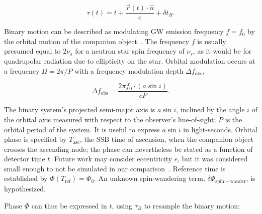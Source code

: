 
\begin{equation}
\tau(t) 
 = t + \frac{\vec{r}(t) \cdot \hat{n}}{c} + \delta t_R.
\label{barycentering_time_domain}
\end{equation}

Binary motion can be described as modulating GW emission frequency $f=f_0$ by the orbital motion of the companion object~\cite{GoetzTwoSpectResults2014}.
The frequency $f$ is usually presumed equal to $2\nu_s$ for a neutron star spin frequency of $\nu_s$, as it would be for quadrupolar radiation due to ellipticity on the star.
Orbital modulation occurs at a frequency $\Omega = 2\pi/P$ with a frequency modulation depth $\Delta f_\mathrm{obs}$,

\begin{equation}
\Delta f_\mathrm{obs} = \frac{2 \pi f_0 \cdot (a \sin i)}{cP}.
\label{TwoSpect_mod_depth}
\end{equation}

\noindent The binary system's projected semi-major axis is $a \sin i$, inclined by the angle $i$ of the orbital axis measured with respect to the observer's line-of-sight; $P$ is the orbital period of the system.
It is useful to express $a \sin i$ in light-seconds.
Orbital phase is specified by $T_\mathrm{asc}$, the SSB time of ascension, when the companion object crosses the ascending node; the phase can nevertheless be stated as a function of detector time $t$.
Future work may consider eccentricity $e$, but it was considered small enough to not be simulated in our comparison~\cite{ScoX1MDC2015PRD}.
Reference time is established by $\Phi(T_\mathrm{ref}) = \Phi_0$.
An unknown spin-wandering term, $\delta \Phi_\mathrm{spin-wander}$, is hypothesized.

Phase $\Phi$ can thus be expressed in $t$, using $\tau_B$ to resample the binary motion: 


